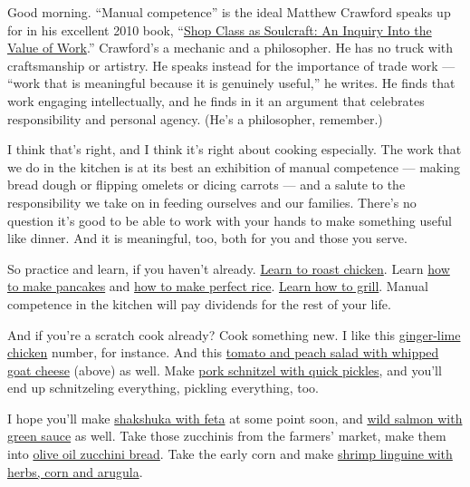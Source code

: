 Good morning. ``Manual competence'' is the ideal Matthew Crawford speaks
up for in his excellent 2010 book,
``\href{https://www.penguinrandomhouse.com/books/301618/shop-class-as-soulcraft-by-matthew-b-crawford/}{Shop
Class as Soulcraft: An Inquiry Into the Value of Work}.'' Crawford's a
mechanic and a philosopher. He has no truck with craftsmanship or
artistry. He speaks instead for the importance of trade work --- ``work
that is meaningful because it is genuinely useful,'' he writes. He finds
that work engaging intellectually, and he finds in it an argument that
celebrates responsibility and personal agency. (He's a philosopher,
remember.)

I think that's right, and I think it's right about cooking especially.
The work that we do in the kitchen is at its best an exhibition of
manual competence --- making bread dough or flipping omelets or dicing
carrots --- and a salute to the responsibility we take on in feeding
ourselves and our families. There's no question it's good to be able to
work with your hands to make something useful like dinner. And it is
meaningful, too, both for you and those you serve.

So practice and learn, if you haven't already.
\href{https://cooking.nytimes3xbfgragh.onion/guides/11-how-to-roast-chicken}{Learn
to roast chicken}. Learn
\href{https://cooking.nytimes3xbfgragh.onion/guides/24-how-to-make-pancakes}{how
to make pancakes} and
\href{https://cooking.nytimes3xbfgragh.onion/guides/49-how-to-make-rice}{how
to make perfect rice}.
\href{https://cooking.nytimes3xbfgragh.onion/guides/7-how-to-grill}{Learn
how to grill}. Manual competence in the kitchen will pay dividends for
the rest of your life.

And if you're a scratch cook already? Cook something new. I like this
\href{https://cooking.nytimes3xbfgragh.onion/recipes/1021294-ginger-lime-chicken}{ginger-lime
chicken} number, for instance. And this
\href{https://cooking.nytimes3xbfgragh.onion/recipes/1020367-tomato-and-peach-salad-with-whipped-goat-cheese}{tomato
and peach salad with whipped goat cheese} (above) as well. Make
\href{https://cooking.nytimes3xbfgragh.onion/recipes/1016866-pork-schnitzel-with-quick-pickles}{pork
schnitzel with quick pickles}, and you'll end up schnitzeling
everything, pickling everything, too.

I hope you'll make
\href{https://cooking.nytimes3xbfgragh.onion/recipes/1014721-shakshuka-with-feta}{shakshuka
with feta} at some point soon, and
\href{https://cooking.nytimes3xbfgragh.onion/recipes/1014868-wild-salmon-with-green-sauce}{wild
salmon with green sauce} as well. Take those zucchinis from the farmers'
market, make them into
\href{https://cooking.nytimes3xbfgragh.onion/recipes/1017522-olive-oil-zucchini-bread}{olive
oil zucchini bread}. Take the early corn and make
\href{https://cooking.nytimes3xbfgragh.onion/recipes/1020354-shrimp-linguine-with-herbs-corn-and-arugula}{shrimp
linguine with herbs, corn and arugula}.

